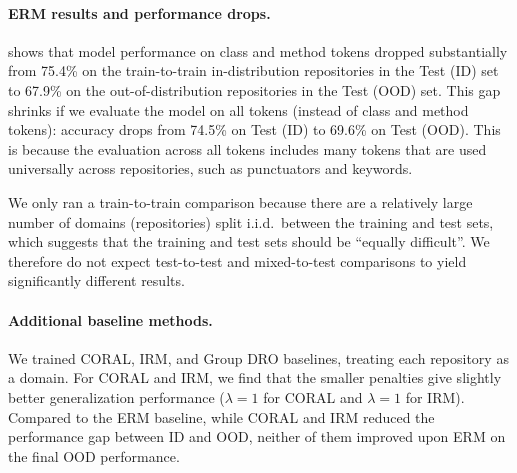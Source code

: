 \paragraph{ERM results and performance drops.}
 shows that model performance on class and method tokens dropped substantially from 75.4\% on the train-to-train in-distribution repositories in the Test (ID) set to 67.9\% on the out-of-distribution repositories in the Test (OOD) set.
This gap shrinks if we evaluate the model on all tokens (instead of class and method tokens): accuracy drops from 74.5\% on Test (ID) to 69.6\% on Test (OOD). This is because the evaluation across all tokens includes many tokens that are used universally across repositories, such as punctuators and keywords.

We only ran a train-to-train comparison because there are a relatively large number of domains (repositories) split i.i.d.~between the training and test sets, which suggests that the training and test sets should be ``equally difficult''.
We therefore do not expect test-to-test and mixed-to-test comparisons to yield significantly different results.

\paragraph{Additional baseline methods.}
We trained CORAL, IRM, and Group DRO baselines, treating each repository as a domain. For CORAL and IRM, we find that the smaller penalties give slightly better generalization performance ($\lambda = 1$ for CORAL and $\lambda = 1$ for IRM).
Compared to the ERM baseline, while CORAL and IRM reduced the performance gap between ID and OOD, neither of them improved upon ERM on the final OOD performance.

